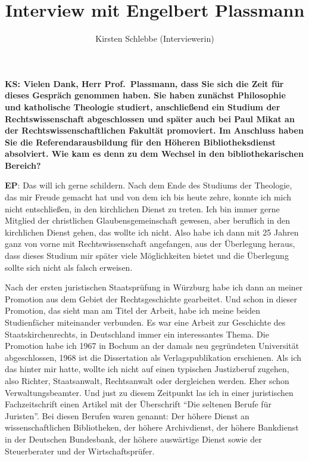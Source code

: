 \documentclass[a4paper,
fontsize=11pt,
oneside,
numbers=noperiodatend,
parskip=half-,
bibliography=totoc,
final
]{scrartcl}
\title{\LARGE{Interview mit Engelbert Plassmann}}%
\author{Kirsten Schlebbe (Interviewerin)} %
\date{}
\begin{document}
\maketitle
\thispagestyle{fancyplain} 


\textbf{KS: Vielen Dank, Herr Prof.~Plassmann, dass Sie sich die Zeit
für dieses Gespräch genommen haben. Sie haben zunächst Philosophie und
katholische Theologie studiert, anschließend ein Studium der
Rechtswissenschaft abgeschlossen und später auch bei Paul Mikat an der
Rechtswissenschaftlichen Fakultät promoviert. Im Anschluss haben Sie die
Referendarausbildung für den Höheren Bibliotheksdienst absolviert. Wie
kam es denn zu dem Wechsel in den bibliothekarischen Bereich?}

\textbf{EP}: Das will ich gerne schildern. Nach dem Ende des Studiums
der Theologie, das mir Freude gemacht hat und von dem ich bis heute
zehre, konnte ich mich nicht entschließen, in den kirchlichen Dienst zu
treten. Ich bin immer gerne Mitglied der christlichen
Glaubensgemeinschaft gewesen, aber beruflich in den kirchlichen Dienst
gehen, das wollte ich nicht. Also habe ich dann mit 25 Jahren ganz von
vorne mit Rechtswissenschaft angefangen, aus der Überlegung heraus, dass
dieses Studium mir später viele Möglichkeiten bietet und die Überlegung
sollte sich nicht als falsch erweisen.

Nach der ersten juristischen Staatsprüfung in Würzburg habe ich dann an
meiner Promotion aus dem Gebiet der Rechtsgeschichte gearbeitet. Und
schon in dieser Promotion, das sieht man am Titel der Arbeit, habe ich
meine beiden Studienfächer miteinander verbunden. Es war eine Arbeit zur
Geschichte des Staatskirchenrechts, in Deutschland immer ein
interessantes Thema. Die Promotion habe ich 1967 in Bochum an der damals
neu gegründeten Universität abgeschlossen, 1968 ist die Dissertation als
Verlagspublikation erschienen. Als ich das hinter mir hatte, wollte ich
nicht auf einen typischen Justizberuf zugehen, also Richter,
Staatsanwalt, Rechtsanwalt oder dergleichen werden. Eher schon
Verwaltungsbeamter. Und just zu diesem Zeitpunkt las ich in einer
juristischen Fachzeitschrift einen Artikel mit der Überschrift
\enquote{Die seltenen Berufe für Juristen}. Bei diesen Berufen waren
genannt: Der höhere Dienst an wissenschaftlichen Bibliotheken, der
höhere Archivdienst, der höhere Bankdienst in der Deutschen Bundesbank,
der höhere auswärtige Dienst sowie der Steuerberater und der
Wirtschaftsprüfer.
\end{document}
